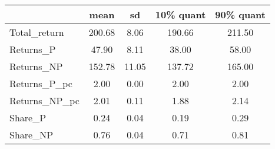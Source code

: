 \begin{tabular}{lcccc}
\toprule
{} &    mean &     sd &  10\% quant &  90\% quant \\
\midrule
Total\_return  &  200.68 &   8.06 &     190.66 &     211.50 \\
Returns\_P     &   47.90 &   8.11 &      38.00 &      58.00 \\
Returns\_NP    &  152.78 &  11.05 &     137.72 &     165.00 \\
Returns\_P\_pc  &    2.00 &   0.00 &       2.00 &       2.00 \\
Returns\_NP\_pc &    2.01 &   0.11 &       1.88 &       2.14 \\
Share\_P       &    0.24 &   0.04 &       0.19 &       0.29 \\
Share\_NP      &    0.76 &   0.04 &       0.71 &       0.81 \\
\bottomrule
\end{tabular}
